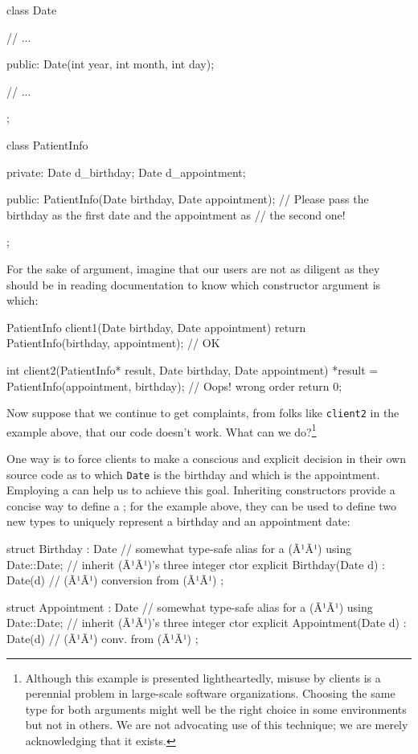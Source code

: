 \begin{emcppslisting}[language=C++]
class Date
{
    // ...

public:
    Date(int year, int month, int day);

    // ...
};

class PatientInfo
{
private:
    Date d_birthday;
    Date d_appointment;

public:
    PatientInfo(Date birthday, Date appointment);
        // Please pass the birthday as the first date and the appointment as
        // the second one!
};
\end{emcppslisting}
    
\noindent For the sake of argument, imagine that our users are not as diligent as
they should be in reading documentation to know which constructor
argument is which:

\begin{emcppslisting}[language=C++]
PatientInfo client1(Date birthday, Date appointment)
{
    return PatientInfo(birthday, appointment);  // OK
}

int client2(PatientInfo* result, Date birthday, Date appointment)
{
    *result = PatientInfo(appointment, birthday);  // Oops! wrong order
    return 0;
}
\end{emcppslisting}
    
\noindent Now suppose that we continue to get complaints, from folks like
\lstinline!client2! in the example above, that our code doesn't work. What can we
do?{\cprotect\footnote{Although this example is presented lightheartedly, misuse by clients is a perennial problem in large-scale
software organizations. Choosing the same type for both arguments
might well be the right choice in some environments but not in others.
We are not advocating use of this technique; we are merely
  acknowledging that it exists.}}

One way is to force clients to make a conscious and explicit decision in
their own source code as to which \lstinline!Date! is the birthday and
which is the appointment. Employing a 
can help us to achieve this goal. Inheriting constructors provide a
concise way to define a ; for
the example above, they can be used to define two new types to
 uniquely represent a birthday and an appointment date:

\begin{emcppslisting}[language=C++]
struct Birthday : Date  // somewhat type-safe alias for a (Ã¹{}Ã¹)
{
    using Date::Date;  // inherit (Ã¹{}Ã¹)'s three integer ctor
    explicit Birthday(Date d) : Date(d) { }  // (Ã¹{}Ã¹) conversion from (Ã¹{}Ã¹)
};

struct Appointment : Date  // somewhat type-safe alias for a (Ã¹{}Ã¹)
{
    using Date::Date;  // inherit (Ã¹{}Ã¹)'s three integer ctor
    explicit Appointment(Date d) : Date(d) { }  // (Ã¹{}Ã¹) conv. from (Ã¹{}Ã¹)
};
\end{emcppslisting}
    
